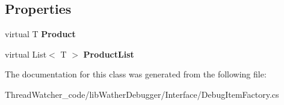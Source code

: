 \subsection*{Properties}
\begin{DoxyCompactItemize}
\item 
\hypertarget{classlib_wather_debugger_1_1_item_factory_3_01_t_01_4_a2506cdb10417830f5d53fe9cba63a669}{virtual T {\bfseries Product}}\label{classlib_wather_debugger_1_1_item_factory_3_01_t_01_4_a2506cdb10417830f5d53fe9cba63a669}

\item 
\hypertarget{classlib_wather_debugger_1_1_item_factory_3_01_t_01_4_a781fd3ed91bc7e021d68d1fde4c8f6e1}{virtual List$<$ T $>$ {\bfseries Product\+List}}\label{classlib_wather_debugger_1_1_item_factory_3_01_t_01_4_a781fd3ed91bc7e021d68d1fde4c8f6e1}

\end{DoxyCompactItemize}


The documentation for this class was generated from the following file\+:\begin{DoxyCompactItemize}
\item 
Thread\+Watcher\+\_\+code/lib\+Wather\+Debugger/\+Interface/Debug\+Item\+Factory.\+cs\end{DoxyCompactItemize}
